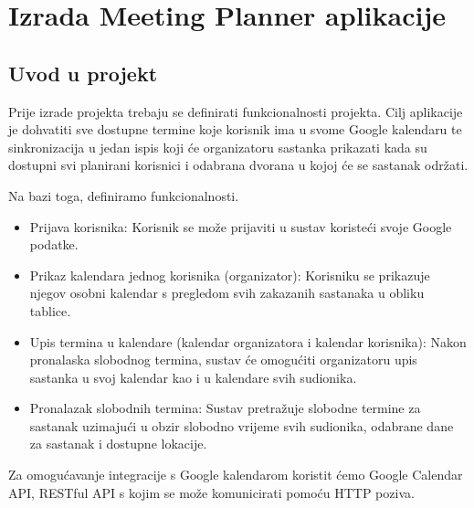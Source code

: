 \documentclass{foi}
\begin{document}
\chapter{Izrada Meeting Planner aplikacije}
\section{Uvod u projekt}
Prije izrade projekta trebaju se definirati funkcionalnosti projekta. Cilj aplikacije je dohvatiti sve dostupne termine koje korisnik ima u svome Google kalendaru te sinkronizacija u jedan ispis koji će organizatoru sastanka prikazati kada su dostupni svi planirani korisnici i odabrana dvorana u kojoj će se sastanak održati. 

Na bazi toga, definiramo funkcionalnosti.
\begin{itemize}
    \item Prijava korisnika: Korisnik se može prijaviti u sustav koristeći svoje Google podatke.
    \item Prikaz kalendara jednog korisnika (organizator): Korisniku se prikazuje njegov osobni kalendar s pregledom svih zakazanih sastanaka u obliku tablice.
    \item Upis termina u kalendare (kalendar organizatora i kalendar korisnika): Nakon pronalaska slobodnog termina, sustav će omogućiti organizatoru upis sastanka u svoj kalendar kao i u kalendare svih sudionika.
    \item Pronalazak slobodnih termina: Sustav pretražuje slobodne termine za sastanak uzimajući u obzir slobodno vrijeme svih sudionika, odabrane dane za sastanak i dostupne lokacije.
\end{itemize}

Za omogućavanje integracije s Google kalendarom koristit ćemo Google Calendar API, RESTful API s kojim se može komunicirati pomoću HTTP poziva.
\end{document}
